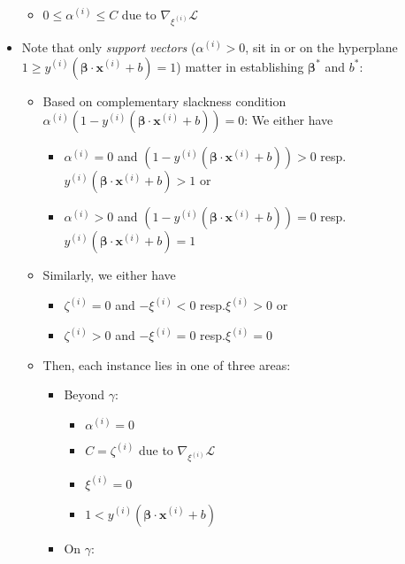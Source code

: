 \begin{itemize}
\begin{itemize}
        \item $0 \leq \alpha^{(i)} \leq C$ due to $\nabla_{\xi^{(i)}} \mathcal{L}$ 
    \end{itemize}
    \item Note that only \emph{support vectors} ($\alpha^{(i)} > 0$, sit in or on the hyperplane $ 1 \geq y^{(i)} (\boldsymbol{\beta} \cdot \boldsymbol{x}^{(i)} + b) = 1$) matter in establishing $\boldsymbol{\beta}^{*}$ and $b^*$:
    \begin{itemize}
        \item Based on complementary slackness condition $\alpha^{(i)} (1 - y^{(i)} (\boldsymbol{\beta} \cdot \boldsymbol{x}^{(i)} + b)) = 0$: We either have 
        \begin{itemize}
            \item $\alpha^{(i)} = 0$ and $ (1 - y^{(i)} (\boldsymbol{\beta} \cdot \boldsymbol{x}^{(i)} + b)) > 0$ resp.$ y^{(i)} (\boldsymbol{\beta} \cdot \boldsymbol{x}^{(i)} + b) > 1$ or
            \item $\alpha^{(i)} > 0$ and $ (1 - y^{(i)} (\boldsymbol{\beta} \cdot \boldsymbol{x}^{(i)} + b)) = 0$ resp.$ y^{(i)} (\boldsymbol{\beta} \cdot \boldsymbol{x}^{(i)} + b) = 1$ 
        \end{itemize}
        \item Similarly, we either have
        \begin{itemize}
            \item $\zeta^{(i)} = 0$ and $ -\xi^{(i)} < 0$ resp.$ \xi^{(i)} > 0$ or
            \item $\zeta^{(i)} > 0$ and $ -\xi^{(i)} = 0$ resp.$ \xi^{(i)} = 0$
        \end{itemize}
        \item Then, each instance lies in one of three areas:
        \begin{itemize}
            \item Beyond $\gamma$:
            \begin{itemize}
                \item $\alpha^{(i)} = 0$
                \item $C = \zeta^{(i)}$ due to $\nabla_{\xi^{(i)}} \mathcal{L}$
                \item $\xi^{(i)} = 0$
                \item $1 < y^{(i)} (\boldsymbol{\beta} \cdot \boldsymbol{x}^{(i)} + b)$
            \end{itemize}
            \item On $\gamma$:
            \begin{itemize}

\end{itemize}
\end{itemize}
\end{itemize}
\end{itemize}
